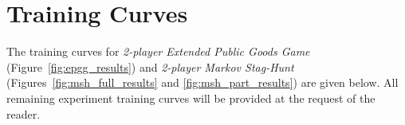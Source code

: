 \documentclass{ecai}
\theoremstyle{plain}
\theoremstyle{definition}
\theoremstyle{remark}
\begin{document}






\section{Training Curves} \label{appsec:training_curves}
The training curves for \textit{2-player Extended Public Goods Game} (Figure~\ref{fig:epgg_results}) and
\textit{2-player Markov Stag-Hunt} (Figures~\ref{fig:msh_full_results} and \ref{fig:msh_part_results}) are given below. All remaining experiment training curves will be provided at the request of the reader.
% 

% 


\end{document}
